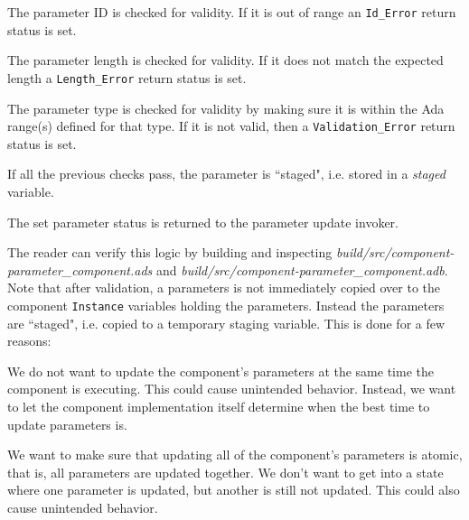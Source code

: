 \vspace{5mm} %
\begin{spacedenumerate}
  \item The parameter ID is checked for validity. If it is out of range an \texttt{Id\_Error} return status is set.
  \item The parameter length is checked for validity. If it does not match the expected length a \texttt{Length\_Error} return status is set.
  \item The parameter type is checked for validity by making sure it is within the Ada range(s) defined for that type. If it is not valid, then a \texttt{Validation\_Error} return status is set.
  \item If all the previous checks pass, the parameter is ``staged", i.e. stored in a \textit{staged} variable.
  \item The set parameter status is returned to the parameter update invoker.
\end{spacedenumerate}
\vspace{5mm} %

The reader can verify this logic by building and inspecting \textit{build/src/component-parameter\_component.ads} and \textit{build/src/component-parameter\_component.adb}. \\

Note that after validation, a parameters is not immediately copied over to the component \texttt{Instance} variables holding the parameters. Instead the parameters are ``staged", i.e. copied to a temporary staging variable. This is done for a few reasons:

\vspace{5mm} %
\begin{spacedenumerate}
  \item We do not want to update the component's parameters at the same time the component is executing. This could cause unintended behavior. Instead, we want to let the component implementation itself determine when the best time to update parameters is.
  \item We want to make sure that updating all of the component's parameters is atomic, that is, all parameters are updated together. We don't want to get into a state where one parameter is updated, but another is still not updated. This could also cause unintended behavior.
\end{spacedenumerate}
\vspace{5mm} %

